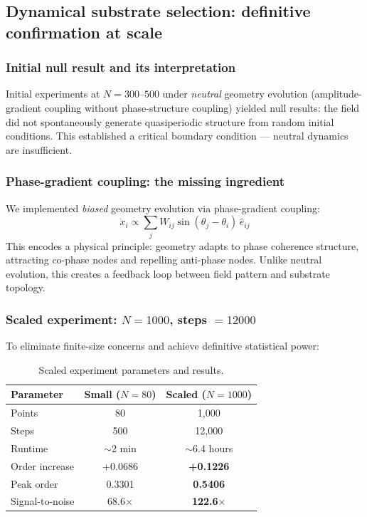 \documentclass[12pt,a4paper]{article}
\theoremstyle{plain}
\theoremstyle{definition}
\begin{document}
\subsection{Dynamical substrate selection: definitive confirmation at scale}
\label{sec:dynamical}

\subsubsection{Initial null result and its interpretation}

Initial experiments at $N = 300$--$500$ under \emph{neutral} geometry evolution
(amplitude-gradient coupling without phase-structure coupling) yielded null results:
the field did not spontaneously generate quasiperiodic structure from random initial
conditions. This established a critical boundary condition --- neutral dynamics are insufficient.

\subsubsection{Phase-gradient coupling: the missing ingredient}

We implemented \emph{biased} geometry evolution via phase-gradient coupling:
\begin{equation}
\dot{x}_i \propto \sum_j W_{ij} \sin(\theta_j - \theta_i)\, \hat{e}_{ij}
\end{equation}
This encodes a physical principle: geometry adapts to phase coherence structure,
attracting co-phase nodes and repelling anti-phase nodes. Unlike neutral evolution,
this creates a feedback loop between field pattern and substrate topology.

\subsubsection{Scaled experiment: $N = 1000$, steps $= 12000$}

To eliminate finite-size concerns and achieve definitive statistical power:

\begin{table}[H]
\centering
\caption{Scaled experiment parameters and results.}
\label{tab:scaled}
\begin{tabular}{lcc}
\toprule
\textbf{Parameter} & \textbf{Small ($N=80$)} & \textbf{Scaled ($N=1000$)} \\
\midrule
Points & 80 & 1,000 \\
Steps & 500 & 12,000 \\
Runtime & $\sim$2 min & $\sim$6.4 hours \\
Order increase & +0.0686 & \textbf{+0.1226} \\
Peak order & 0.3301 & \textbf{0.5406} \\
Signal-to-noise & 68.6$\times$ & \textbf{122.6$\times$} \\
\bottomrule
\end{tabular}
\end{table}
\end{document}
